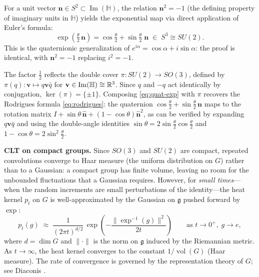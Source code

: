 For a unit vector $\mathbf{n} \in S^2 \subset \operatorname{Im}(\mathbb{H})$, the relation $\mathbf{n}^2 = -1$ (the defining property of imaginary units in $\mathbb{H}$) yields the exponential map via direct application of Euler's formula:
\begin{equation}\label{eq:quat-exp}
\exp\!\left(\tfrac{\theta}{2}\,\mathbf{n}\right) = \cos\tfrac{\theta}{2} + \sin\tfrac{\theta}{2}\;\mathbf{n} \;\in\; S^3 \cong SU(2).
\end{equation}
This is the quaternionic generalization of $e^{i\alpha} = \cos\alpha + i\sin\alpha$: the proof is identical, with $\mathbf{n}^2 = -1$ replacing $i^2 = -1$.

The factor $\frac{1}{2}$ reflects the double cover $\pi : SU(2) \to SO(3)$, defined by $\pi(q) : \mathbf{v} \mapsto q\mathbf{v}\bar{q}$ for $\mathbf{v} \in \operatorname{Im}(\mathbb{H}) \cong \mathbb{R}^3$. Since $q$ and $-q$ act identically by conjugation, $\ker(\pi) = \{\pm 1\}$. Composing \eqref{eq:quat-exp} with $\pi$ recovers the Rodrigues formula \eqref{eq:rodrigues}: the quaternion $\cos\frac{\theta}{2} + \sin\frac{\theta}{2}\,\mathbf{n}$ maps to the rotation matrix $I + \sin\theta\,\hat{\mathbf{n}} + (1-\cos\theta)\hat{\mathbf{n}}^2$, as can be verified by expanding $q\mathbf{v}\bar{q}$ and using the double-angle identities $\sin\theta = 2\sin\frac{\theta}{2}\cos\frac{\theta}{2}$ and $1 - \cos\theta = 2\sin^2\frac{\theta}{2}$.

\medskip\noindent\textbf{CLT on compact groups.}
Since $SO(3)$ and $SU(2)$ are compact, repeated convolutions converge to Haar measure (the uniform distribution on $G$) rather than to a Gaussian: a compact group has finite volume, leaving no room for the unbounded fluctuations that a Gaussian requires. However, for \emph{small times}---when the random increments are small perturbations of the identity---the heat kernel $p_t$ on $G$ is well-approximated by the Gaussian on $\mathfrak{g}$ pushed forward by $\exp$:
\[
p_t(g) \;\approx\; \frac{1}{(2\pi t)^{d/2}}\, \exp\!\left(-\frac{\|\exp^{-1}(g)\|^2}{2t}\right) \qquad \text{as } t \to 0^+,\; g \to e,
\]
where $d = \dim G$ and $\|\cdot\|$ is the norm on $\mathfrak{g}$ induced by the Riemannian metric. As $t \to \infty$, the heat kernel converges to the constant $1/\operatorname{vol}(G)$ (Haar measure). The rate of convergence is governed by the representation theory of $G$; see Diaconis \cite{Diaconis}.

